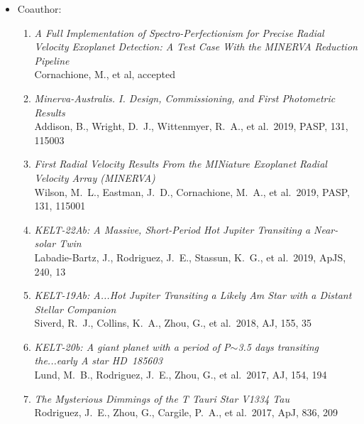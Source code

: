 \documentclass{article}
\newcommand{\comment}[1]{}
\begin{document}
\begin{itemize}
\item[]{\large{Coauthor:}}
\begin{enumerate}
\item{\it A Full Implementation of Spectro-Perfectionism for Precise Radial Velocity Exoplanet Detection:  A Test Case With the MINERVA Reduction Pipeline} \\
Cornachione, M., et al, accepted
\item{\it Minerva-Australis. I. Design, Commissioning, and First Photometric Results}\\
Addison, B., Wright, D.~J., Wittenmyer, R.~A., et al.\ 2019, PASP, 131, 115003
\item {\it First Radial Velocity Results From the MINiature Exoplanet Radial Velocity Array (MINERVA)} \\
Wilson, M.~L., Eastman, J.~D., Cornachione, M.~A., et al.\ 2019, PASP, 131, 115001
\item{\it KELT-22Ab: A Massive, Short-Period Hot Jupiter Transiting a Near-solar Twin}\\
Labadie-Bartz, J., Rodriguez, J.~E., Stassun, K.~G., et al.\ 2019, ApJS, 240, 13
\item{\it KELT-19Ab: A...Hot Jupiter Transiting a Likely Am Star with a Distant Stellar Companion}\\
 Siverd, R.~J., Collins, K.~A., Zhou, G., et al.\ 2018, AJ, 155, 35
\item{\it KELT-20b: A giant planet with a period of P}$\sim${\it3.5 days transiting the...early A star HD~185603}\\
Lund, M.~B., Rodriguez, J.~E., Zhou, G., et al.\ 2017, AJ, 154, 194
\item{\it The Mysterious Dimmings of the T Tauri Star V1334 Tau}\\
Rodriguez, J.~E., Zhou, G., Cargile, P.~A., et al.\ 2017, ApJ, 836, 209
\end{enumerate}

\end{itemize}


\comment{ this section feels stupid, but sort of empty without it

{\Large{Skills}}
\begin{itemize}
\item[-] Programming; Experience with Python, C++, IDL, Maple, LabView, and MATLAB.\\ 
\item[-] Data acquisition and analysis, error analysis, and scientific writing (using \LaTeX)
\item[-] Metal shop work (mill, lathe) with steel and aluminum
\end{itemize}
}
\end{document}
